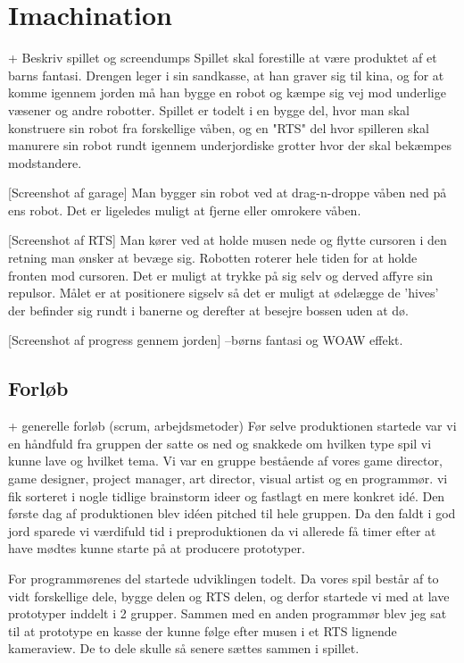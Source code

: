 \section{Imachination}
                + Beskriv spillet og screendumps
Spillet skal forestille at være produktet af et barns fantasi. Drengen leger i sin sandkasse, at han graver sig til kina, og for at komme igennem jorden må han bygge en robot og kæmpe sig vej mod underlige væsener og andre robotter.
Spillet er todelt i en bygge del, hvor man skal konstruere sin robot fra forskellige våben, og en "RTS" del hvor spilleren skal manurere sin robot rundt igennem underjordiske grotter hvor der skal bekæmpes modstandere.

[Screenshot af garage]
Man bygger sin robot ved at drag-n-droppe våben ned på ens robot. Det er ligeledes muligt at fjerne eller omrokere våben.

[Screenshot af RTS]
Man kører ved at holde musen nede og flytte cursoren i den retning man ønsker at bevæge sig. Robotten roterer hele tiden for at holde fronten mod cursoren. Det er muligt at trykke på sig selv og derved affyre sin repulsor. Målet er at positionere sigselv så det er muligt at ødelægge de 'hives' der befinder sig rundt i banerne og derefter at besejre bossen uden at dø.

[Screenshot af progress gennem jorden]
--børns fantasi og WOAW effekt.

\subsection{Forløb}

                + generelle forløb (scrum, arbejdsmetoder)
Før selve produktionen startede var vi en håndfuld fra gruppen der satte os ned og snakkede om hvilken type spil vi kunne lave og hvilket tema. Vi var en gruppe bestående af vores game director, game designer, project manager, art director, visual artist og en programmør. vi fik sorteret i nogle tidlige brainstorm ideer og fastlagt en mere konkret idé. Den første dag af produktionen blev idéen pitched til hele gruppen. Da den faldt i god jord sparede vi værdifuld tid i preproduktionen da vi allerede få timer efter at have mødtes kunne starte på at producere prototyper.

For programmørenes del startede udviklingen todelt. Da vores spil består af to vidt forskellige dele, bygge delen og RTS delen, og derfor startede vi med at lave prototyper inddelt i 2 grupper. Sammen med en anden programmør blev jeg sat til at prototype en kasse der kunne følge efter musen i et RTS lignende kameraview. De to dele skulle så senere sættes sammen i spillet.

